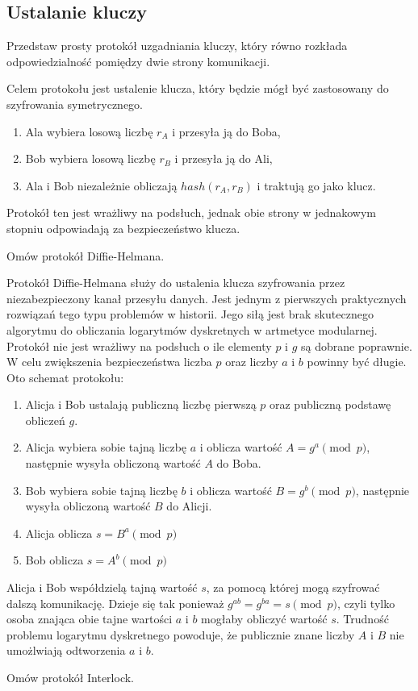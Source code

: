 \documentclass[answers,11pt]{exam}
\begin{document}
\subsection{Ustalanie kluczy}
\begin{questions}

\question Przedstaw prosty protokół uzgadniania kluczy, który równo rozkłada odpowiedzialność pomiędzy dwie strony komunikacji.
\begin{solution}
Celem protokołu jest ustalenie klucza, który będzie mógł być zastosowany do szyfrowania symetrycznego. 
\begin{enumerate}
\item Ala wybiera losową liczbę $r_A$ i przesyła ją do Boba,
\item Bob wybiera losową liczbę $r_B$ i przesyła ją do Ali,
\item Ala i Bob niezależnie obliczają $hash(r_A, r_B)$ i traktują go jako klucz.
\end{enumerate}
Protokół ten jest wrażliwy na podsłuch, jednak obie strony w jednakowym stopniu odpowiadają za bezpieczeństwo klucza.
\end{solution}

\question Omów protokół Diffie-Helmana.
\begin{solution}
Protokół Diffie-Helmana służy do ustalenia klucza szyfrowania przez niezabezpieczony kanał przesyłu danych. Jest jednym z pierwszych praktycznych rozwiązań tego typu problemów w historii. Jego siłą jest brak skutecznego algorytmu do obliczania logarytmów dyskretnych w artmetyce modularnej. Protokół nie jest wrażliwy na podsłuch o ile elementy $p$ i $g$ są dobrane poprawnie. W celu zwiększenia bezpieczeństwa liczba $p$ oraz liczby $a$ i $b$ powinny być długie. Oto schemat protokołu:
\begin{enumerate}
\item Alicja i Bob ustalają publiczną liczbę pierwszą $p$ oraz publiczną podstawę obliczeń $g$.
\item Alicja wybiera sobie tajną liczbę $a$ i oblicza wartość $A=g^{a} \pmod{p}$, następnie wysyła obliczoną wartość $A$ do Boba.
\item Bob wybiera sobie tajną liczbę $b$ i oblicza wartość $B=g^{b} \pmod{p}$, następnie wysyła obliczoną wartość $B$ do Alicji.
\item Alicja oblicza $s=B^{a} \pmod{p}$
\item Bob oblicza $s=A^{b} \pmod{p}$
\end{enumerate}
Alicja i Bob współdzielą tajną wartość $s$, za pomocą której mogą szyfrować dalszą komunikację. Dzieje się tak ponieważ $g^{ab}=g^{ba}=s \pmod{p}$, czyli tylko osoba znająca obie tajne wartości $a$ i $b$ mogłaby obliczyć wartość $s$. Trudność problemu logarytmu dyskretnego powoduje, że publicznie znane liczby $A$ i $B$ nie umożlwiają odtworzenia $a$ i $b$.
\end{solution}

\question Omów protokół Interlock.

\end{questions}
\end{document}
